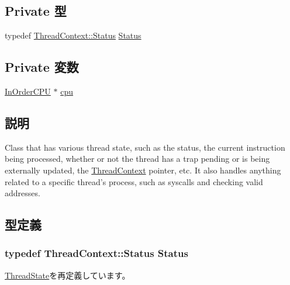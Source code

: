 \subsection*{Private 型}
\begin{DoxyCompactItemize}
\item 
typedef \hyperlink{classThreadContext_a67a0db04d321a74b7e7fcfd3f1a3f70b}{ThreadContext::Status} \hyperlink{classInOrderThreadState_a3af29dcea6d2bbb0a1de56f02ec789f1}{Status}
\end{DoxyCompactItemize}
\subsection*{Private 変数}
\begin{DoxyCompactItemize}
\item 
\hyperlink{classInOrderCPU}{InOrderCPU} $\ast$ \hyperlink{classInOrderThreadState_a41d682c28d0f49e04393c52815808782}{cpu}
\end{DoxyCompactItemize}


\subsection{説明}
Class that has various thread state, such as the status, the current instruction being processed, whether or not the thread has a trap pending or is being externally updated, the \hyperlink{classThreadContext}{ThreadContext} pointer, etc. It also handles anything related to a specific thread's process, such as syscalls and checking valid addresses. 

\subsection{型定義}
\hypertarget{classInOrderThreadState_a3af29dcea6d2bbb0a1de56f02ec789f1}{
\subsubsection[{Status}]{\setlength{\rightskip}{0pt plus 5cm}typedef {\bf ThreadContext::Status} {\bf Status}}}
\label{classInOrderThreadState_a3af29dcea6d2bbb0a1de56f02ec789f1}


\hyperlink{structThreadState_a3af29dcea6d2bbb0a1de56f02ec789f1}{ThreadState}を再定義しています。


